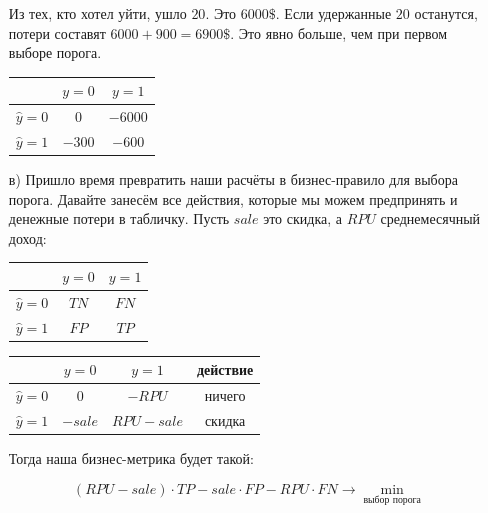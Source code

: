 \documentclass[12pt, a4paper, oneside]{article}
\theoremstyle{plain} %
\theoremstyle{definition}
\begin{document}
\begin{solution}
\begin{enumerate}
Из тех, кто хотел уйти, ушло $20$. Это $6000\$$. Если удержанные $20$ останутся, потери составят $6000 + 900 = 6900\$$. Это явно больше, чем при первом выборе порога. 

\begin{center} 
\begin{tabular}{|c|c|c|}
	\hline
	& $y=0$  &  $ y = 1$ \\  \hline 
	$\hat y = 0$  &   $0$ &    $-6000$ \\      \hline 
	$\hat y = 1$ &   $-300$ &  $-600$ \\      \hline
\end{tabular}
\end{center} 

\item[в)] Пришло время превратить наши расчёты в бизнес-правило для выбора порога. Давайте занесём все действия, которые мы можем предпринять и денежные потери в табличку. Пусть $sale$ это скидка, а $RPU$ среднемесячный доход: 

\begin{minipage}[t]{0.45\textwidth}
\begin{center} 
	\begin{tabular}{|c|c|c|}
		\hline
		& $y=0$  &  $ y = 1$ \\  \hline 
		$\hat y = 0$  &   $TN$ &    $FN$ \\      \hline 
		$\hat y = 1$ &   $FP$ &    $TP$ \\      \hline
	\end{tabular}
\end{center} 
\end{minipage}
\hfill
\begin{minipage}[t]{0.45\textwidth}
\begin{center} 
    \begin{tabular}{|c|c|c|c|}
    	\hline
    	& $y=0$  &  $ y = 1$  & действие\\  \hline 
    	$\hat y = 0$  &  $0$ &   $-RPU$ & ничего \\ \hline 
    	$\hat y = 1$ &   $-sale$ & $RPU - sale$ & скидка \\ \hline
    \end{tabular}
\end{center} 
\end{minipage}

Тогда наша бизнес-метрика будет такой: 

$$
(RPU - sale) \cdot TP  - sale \cdot FP - RPU \cdot FN \to \min_{\text{выбор порога}} 
$$


\end{enumerate}
\end{solution}
\end{document}

